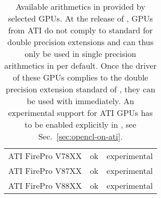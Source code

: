 \begin{table}[tb]
\begin{center}
\begin{tabular}{l|c|c}
ATI FirePro V78XX    & ok & experimental \\
ATI FirePro V87XX    & ok & experimental \\
ATI FirePro V88XX    & ok & experimental \\
\end{tabular}
\caption{Available arithmetics in {\ViennaCL} provided by selected GPUs. At the
release of {\ViennaCLversion}, GPUs from ATI do not comply to {\OpenCL}
standard for double precision extensions and can thus only be used in single
precision arithmetics in {\ViennaCL} per default. Once the driver of these GPUs
complies to the double precision extension standard of {\OpenCL}, they can be
used with {\ViennaCL} immediately. An experimental support for ATI GPUs has to
be enabled explicitly in {\ViennaCL}, see Sec.~\ref{sec:opencl-on-ati}.}
\label{tab:double-precision-GPUs}
\end{center}
\end{table}
